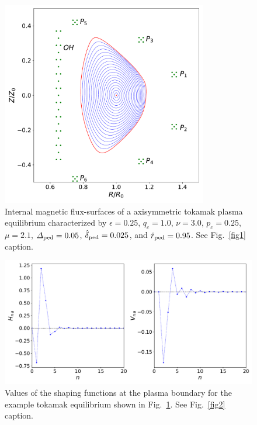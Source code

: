 \documentclass[12pt,prb,aps]{revtex4-1}
\begin{document}
\begin{figure}
\centerline{\includegraphics[width=0.8\textwidth]{Figure4.pdf}}
\caption{Internal magnetic flux-surfaces of a axisymmetric tokamak plasma equilibrium characterized by $\epsilon=0.25$, $q_c=1.0$, $\nu=3.0$, $p_c=0.25$, $\mu=2.1$,
${\mit\Delta}_{\rm ped}=0.05$, $\hat{\delta}_{\rm ped} = 0.025$, and $\hat{r}_{\rm ped}=0.95$.  See Fig.~\ref{fig1} caption. }\label{fig4}
\end{figure}

\begin{figure}
\centerline{\includegraphics[width=\textwidth]{Figure5.pdf}}
\caption{Values of the shaping functions at the plasma boundary for the example tokamak equilibrium shown in Fig.~\ref{fig4}.
See Fig.~\ref{fig2} caption.}\label{fig5}
\end{figure}
\end{document}
